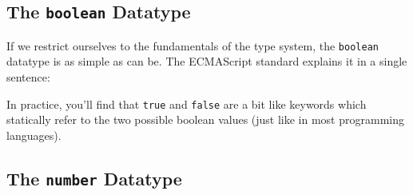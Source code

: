 \documentclass[11pt,letter]{book}
\begin{document}
    \subsection{The \texttt{boolean} Datatype}
    If we restrict ourselves to the fundamentals of the type system, the \texttt{boolean} 
    datatype is as simple as can be. The ECMAScript standard explains it in a single sentence:
    
    In practice, you'll find that \texttt{true} and \texttt{false} are a bit like keywords which 
    statically refer to the two possible boolean values (just like in most programming languages).
    
    \subsection{The \texttt{number} Datatype}
    
    
    
\end{document}
